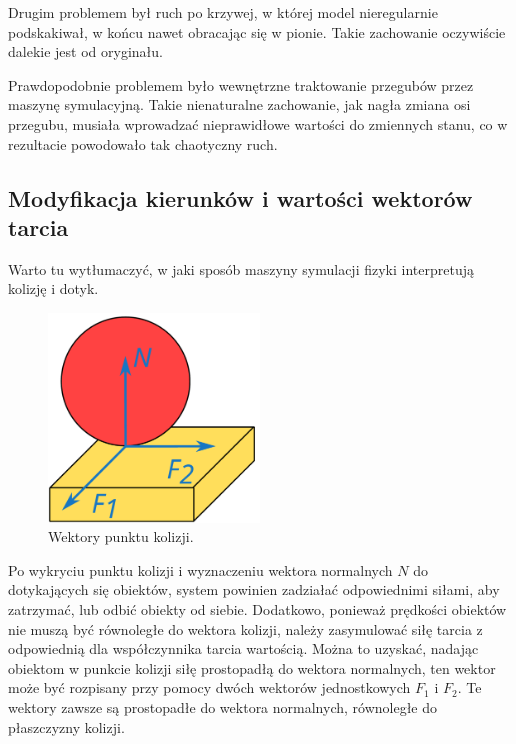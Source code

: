 		Drugim problemem był ruch po krzywej, w której model nieregularnie podskakiwał, w końcu nawet obracając się w pionie.
		Takie zachowanie oczywiście dalekie jest od oryginału.

		Prawdopodobnie problemem było wewnętrzne traktowanie przegubów przez maszynę symulacyjną.
		Takie nienaturalne zachowanie, jak nagła zmiana osi przegubu, musiała wprowadzać nieprawidłowe wartości do zmiennych stanu, 
		co w rezultacie powodowało tak chaotyczny ruch.

	\subsection{Modyfikacja kierunków i wartości wektorów tarcia}
		\label{sec:friction}
		Warto tu wytłumaczyć, w jaki sposób maszyny symulacji fizyki interpretują kolizję i dotyk.

		\begin{figure}[H]
		\centering
		\includegraphics[width=0.5\textwidth]{graphics/friction.pdf}
		\caption{Wektory punktu kolizji.}
		\end{figure} 

		Po wykryciu punktu kolizji i wyznaczeniu wektora normalnych $N$ do dotykających się obiektów, system powinien zadziałać odpowiednimi siłami, 
		aby zatrzymać, lub odbić obiekty od siebie.
		Dodatkowo, ponieważ prędkości obiektów nie muszą być równoległe do wektora kolizji, należy zasymulować siłę tarcia z odpowiednią dla współczynnika tarcia wartością.
		Można to uzyskać, nadając obiektom w punkcie kolizji siłę prostopadłą do wektora normalnych, 
		ten wektor może być rozpisany przy pomocy dwóch wektorów jednostkowych $F_1$ i $F_2$. 
		Te wektory zawsze są prostopadłe do wektora normalnych, równoległe do płaszczyzny kolizji.

